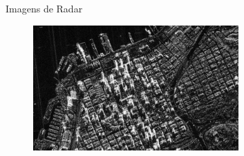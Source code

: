 \documentclass[portuguese]{beamer}
\begin{document}
\begin{frame}{Imagens de Radar}
	\begin{figure}[ht]
		\centering
		\includegraphics[width = 0.7\textwidth]{../report/graphics/sandiego.jpg}
		\label{fig:sandiego}
	\end{figure}
\end{frame}
\end{document}
